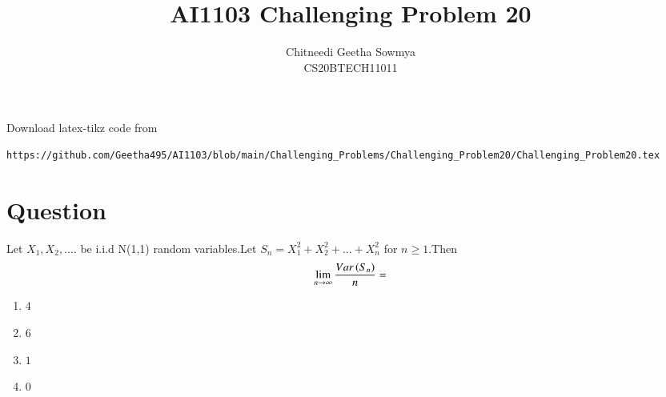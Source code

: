 \documentclass[journal,12pt,twocolumn]{IEEEtran}
\begin{document}
     \def\rightbox#1{\makebox[0in][r]{#1}}
     \def\centbox#1{\makebox[0in]{#1}}
     \def\topbox#1{\raisebox{-\baselineskip}[0in][0in]{#1}}
     \def\midbox#1{\raisebox{-0.5\baselineskip}[0in][0in]{#1}}
\vspace{3cm}
\title{AI1103 Challenging Problem 20}
\author{Chitneedi Geetha Sowmya \\ CS20BTECH11011}
\maketitle
\newpage
\bigskip
\renewcommand{\thefigure}{\theenumi}
\renewcommand{\thetable}{\theenumi}
\newcommand{\dsum}{\displaystyle\sum}
\newcommand{\R}{\mathbb{R}}
\newcommand{\C}{\mathbb{C}}
Download  latex-tikz code from 
%
\begin{lstlisting}
https://github.com/Geetha495/AI1103/blob/main/Challenging_Problems/Challenging_Problem20/Challenging_Problem20.tex\end{lstlisting}

\section{Question}
Let $X_{1},X_{2},....$ be i.i.d N(1,1) random variables.Let $S_{n}=X_{1}^{2}+X_{2}^2+...+X_{n}^{2}$ for $n\ge1$.Then $$\lim_{n \to \infty}{\frac{Var\left(S_{n}\right)}{n}}=$$
\begin{enumerate}[label = (\Alph*)]
\item  $4$
\item  $6$
\item  $1$
\item  $0$
\end{enumerate}
\end{document}
